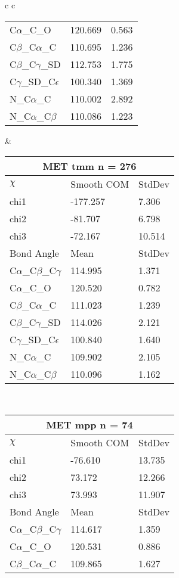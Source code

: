 \begin{longtable}{ c c }
\begin{tabular}{ l l l }
  C$\alpha$\_C\_O & 120.669 & 0.563\\
  C$\beta$\_C$\alpha$\_C & 110.695 & 1.236\\
  C$\beta$\_C$\gamma$\_SD & 112.753 & 1.775\\
  C$\gamma$\_SD\_C$\epsilon$ & 100.340 & 1.369\\
  N\_C$\alpha$\_C & 110.002 & 2.892\\
  N\_C$\alpha$\_C$\beta$ & 110.086 & 1.223\\
  \bottomrule
  \end{tabular}
  &
  \begin{tabular}{ l l l }
  \toprule
  \multicolumn{3}{c}{MET \textbf{tmm} n = 276} \\ \toprule
  $\chi$       & Smooth COM & StdDev \\ \midrule
  chi1 & -177.257 & 7.306 \\ 
  chi2 & -81.707 & 6.798 \\ 
  chi3 & -72.167 & 10.514 \\ \midrule
  Bond Angle   & Mean     & StdDev \\ \midrule
  C$\alpha$\_C$\beta$\_C$\gamma$ & 114.995 & 1.371\\
  C$\alpha$\_C\_O & 120.520 & 0.782\\
  C$\beta$\_C$\alpha$\_C & 111.023 & 1.239\\
  C$\beta$\_C$\gamma$\_SD & 114.026 & 2.121\\
  C$\gamma$\_SD\_C$\epsilon$ & 100.840 & 1.640\\
  N\_C$\alpha$\_C & 109.902 & 2.105\\
  N\_C$\alpha$\_C$\beta$ & 110.096 & 1.162\\
  \bottomrule
  \end{tabular}
  \\
  \begin{tabular}{ l l l }
  \toprule
  \multicolumn{3}{c}{MET \textbf{mpp} n = 74} \\ \toprule
  $\chi$       & Smooth COM & StdDev \\ \midrule
  chi1 & -76.610 & 13.735 \\ 
  chi2 & 73.172 & 12.266 \\ 
  chi3 & 73.993 & 11.907 \\ \midrule
  Bond Angle   & Mean     & StdDev \\ \midrule
  C$\alpha$\_C$\beta$\_C$\gamma$ & 114.617 & 1.359\\
  C$\alpha$\_C\_O & 120.531 & 0.886\\
  C$\beta$\_C$\alpha$\_C & 109.865 & 1.627\\

\end{tabular}
\end{longtable}
